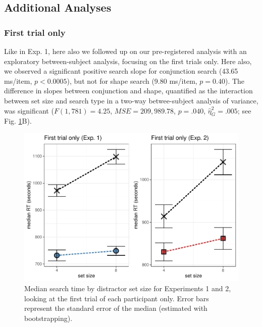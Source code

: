 \documentclass[
  english,
  man]{apa6}
\begin{document}
\hypertarget{additional-analyses-1}{%
\subsection{Additional Analyses}\label{additional-analyses-1}}

\hypertarget{first-trial-only-1}{%
\subsubsection{First trial only}\label{first-trial-only-1}}

Like in Exp. 1, here also we followed up on our pre-registered analysis with an exploratory between-subject analysis, focusing on the first trials only. Here also, we observed a significant positive search slope for conjunction search (43.65 ms/item, \(p<0.0005\)), but not for shape search (9.80 ms/item, \(p=0.40\)). The difference in slopes between conjunction and shape, quantified as the interaction between set size and search type in a two-way betwee-subject analysis of variance, was significant (\(F(1, 781) = 4.25\), \(\mathit{MSE} = 209,989.78\), \(p = .040\), \(\hat{\eta}^2_G = .005\); see Fig. \ref{fig:FirstTrial}B).

\begin{figure}[H]
\includegraphics[width=\textwidth]{termination_files/figure-latex/FirstTrial-1} \caption{Median search time by distractor set size for Experiments 1 and 2, looking at the first trial of each participant only. Error bars represent the standard error of the median (estimated with bootstrapping).}\label{fig:FirstTrial}
\end{figure}
\end{document}
